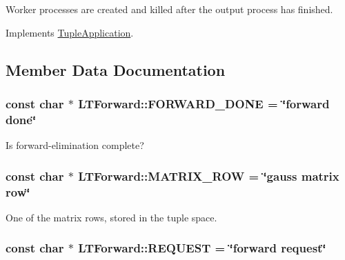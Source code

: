 Worker processes are created and killed after the output process has finished. 

Implements \hyperlink{class_tuple_application_ef6ae8bb1d697e4ed038b43320183c89}{TupleApplication}.

\subsection{Member Data Documentation}
\hypertarget{class_l_t_forward_f638f80e205c1c7dc14766015d1247e6}{
\subsubsection[{FORWARD\_\-DONE}]{\setlength{\rightskip}{0pt plus 5cm}const char $\ast$ {\bf LTForward::FORWARD\_\-DONE} = \char`\"{}forward done\char`\"{}}}
\label{class_l_t_forward_f638f80e205c1c7dc14766015d1247e6}


Is forward-elimination complete? \hypertarget{class_l_t_forward_31820d362b40c3d15df139fde2f871f2}{
\subsubsection[{MATRIX\_\-ROW}]{\setlength{\rightskip}{0pt plus 5cm}const char $\ast$ {\bf LTForward::MATRIX\_\-ROW} = \char`\"{}gauss matrix row\char`\"{}}}
\label{class_l_t_forward_31820d362b40c3d15df139fde2f871f2}


One of the matrix rows, stored in the tuple space. \hypertarget{class_l_t_forward_e5706fd083624c202c274015935c865b}{
\subsubsection[{REQUEST}]{\setlength{\rightskip}{0pt plus 5cm}const char $\ast$ {\bf LTForward::REQUEST} = \char`\"{}forward request\char`\"{}}}
\label{class_l_t_forward_e5706fd083624c202c274015935c865b}


